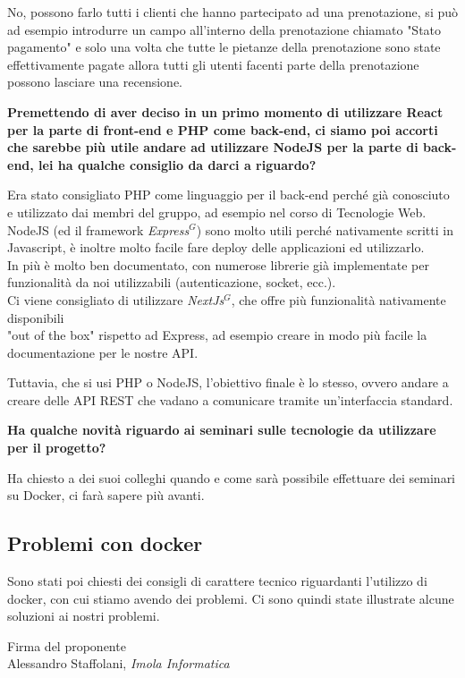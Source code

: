 \documentclass[a4paper, 11pt]{article}
\begin{document}
No, possono farlo tutti i clienti che hanno partecipato ad una prenotazione, si può ad esempio introdurre un campo all'interno della prenotazione chiamato "Stato pagamento" 
e solo una volta che tutte le pietanze della prenotazione sono state effettivamente pagate allora tutti gli utenti facenti parte della prenotazione possono lasciare una recensione. \\ \newline


\textbf{Premettendo di aver deciso in un primo momento di utilizzare React per la parte di front-end e PHP come back-end, ci siamo poi accorti che sarebbe più utile andare ad utilizzare NodeJS per la parte di back-end, lei ha qualche consiglio da darci a riguardo?}

Era stato consigliato PHP come linguaggio per il back-end perché già conosciuto e utilizzato dai membri del gruppo, ad esempio nel corso di Tecnologie Web. \\
NodeJS (ed il framework \emph{Express}$^{G}$) sono molto utili perché nativamente scritti in Javascript, è inoltre molto facile fare deploy delle applicazioni ed utilizzarlo. \\
In più è molto ben documentato, con numerose librerie già implementate per funzionalità da noi utilizzabili (autenticazione, socket, ecc.). \\
Ci viene consigliato di utilizzare \emph{NextJs}$^{G}$, che offre più funzionalità nativamente disponibili \\ "out of the box" rispetto ad Express, ad esempio creare in modo più facile la documentazione per le nostre API.

Tuttavia, che si usi PHP o NodeJS, l'obiettivo finale è lo stesso, ovvero andare a creare delle API REST che vadano a comunicare tramite un'interfaccia standard.\\ \newline

\textbf{Ha qualche novità riguardo ai seminari sulle tecnologie da utilizzare per il progetto?}

Ha chiesto a dei suoi colleghi quando e come sarà possibile effettuare dei seminari su Docker, ci farà sapere più avanti. \\ \newline

\subsection{Problemi con docker}

Sono stati poi chiesti dei consigli di carattere tecnico riguardanti l'utilizzo di docker, con cui stiamo avendo dei problemi.
Ci sono quindi state illustrate alcune soluzioni ai nostri problemi.

\vspace{40pt}
\begin{flushleft}
\hfill Firma del proponente \\
\vspace{50pt}
\hfill Alessandro Staffolani, \textit{Imola Informatica}
\end{flushleft}
\end{document}
